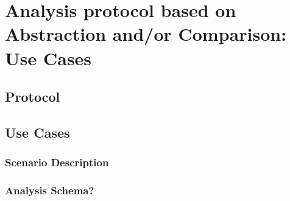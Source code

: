 \section{Analysis protocol based on Abstraction and/or Comparison: Use Cases}
\label{c5:sec-debug}


\subsection{Protocol}
\subsection{Use Cases}
  \subsubsection{Scenario Description}
  \subsubsection{Analysis Schema?}
